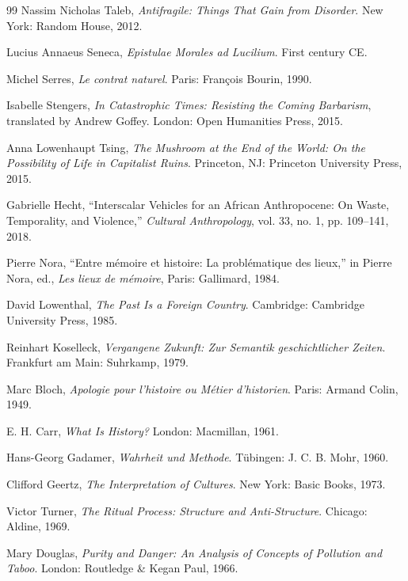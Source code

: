 \documentclass[11pt,oneside]{book}
\theoremstyle{definition}
\theoremstyle{remark}
\begin{document}
\begin{thebibliography}{99}
 Nassim Nicholas Taleb, \emph{Antifragile: Things That Gain from Disorder}. New York: Random
  House, 2012.

 Lucius Annaeus Seneca, \emph{Epistulae Morales ad Lucilium}. First century CE.

 Michel Serres, \emph{Le contrat naturel}. Paris: Fran\c{c}ois Bourin, 1990.

 Isabelle Stengers, \emph{In Catastrophic Times: Resisting the Coming Barbarism}, translated by
  Andrew Goffey. London: Open Humanities Press, 2015.

 Anna Lowenhaupt Tsing, \emph{The Mushroom at the End of the World: On the Possibility of Life in
  Capitalist Ruins}. Princeton, NJ: Princeton University Press, 2015.

 Gabrielle Hecht, ``Interscalar Vehicles for an African Anthropocene: On Waste, Temporality, and
  Violence,'' \emph{Cultural Anthropology}, vol. 33, no. 1, pp. 109--141, 2018.

 Pierre Nora, ``Entre m\'emoire et histoire: La probl\'ematique des lieux,'' in Pierre Nora, ed.,
  \emph{Les lieux de m\'emoire}, Paris: Gallimard, 1984.

 David Lowenthal, \emph{The Past Is a Foreign Country}. Cambridge: Cambridge University Press,
  1985.

 Reinhart Koselleck, \emph{Vergangene Zukunft: Zur Semantik geschichtlicher Zeiten}. Frankfurt am
  Main: Suhrkamp, 1979.

 Marc Bloch, \emph{Apologie pour l'histoire ou M\'etier d'historien}. Paris: Armand Colin, 1949.

 E. H. Carr, \emph{What Is History?} London: Macmillan, 1961.

 Hans-Georg Gadamer, \emph{Wahrheit und Methode}. T\"ubingen: J. C. B. Mohr, 1960.

 Clifford Geertz, \emph{The Interpretation of Cultures}. New York: Basic Books, 1973.

 Victor Turner, \emph{The Ritual Process: Structure and Anti-Structure}. Chicago: Aldine, 1969.

 Mary Douglas, \emph{Purity and Danger: An Analysis of Concepts of Pollution and Taboo}. London:
  Routledge \& Kegan Paul, 1966.


\end{thebibliography}
\end{document}
